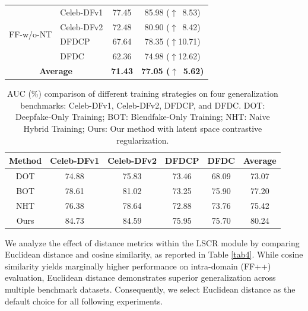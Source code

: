 \documentclass[final,5p,times]{elsarticle}
\begin{document}
\begin{table}[htb]
\begin{tabular}{llcc}
        \multirow{4}{*}{FF-w/o-NT} 
        & Celeb-DFv1  & 77.45 & 85.98 ($\uparrow \,$ 8.53) \\
        & Celeb-DFv2  & 72.48 & 80.90 ($\uparrow \,$ 8.42) \\
        & DFDCP       & 67.64 & 78.35 ($\uparrow$10.71) \\
        & DFDC        & 62.36 & 74.98 ($\uparrow$12.62) \\
        \midrule
        \multicolumn{2}{c}{\textbf{Average}} & \textbf{71.43} & \textbf{77.05 ($\uparrow \,$ 5.62)} \\
        \bottomrule
    \end{tabular}
\end{table}

\begin{table}[htb]\rmfamily
    \centering
    \caption{AUC (\%) comparison of different training strategies on four generalization benchmarks: Celeb-DFv1, Celeb-DFv2, DFDCP, and DFDC. DOT: Deepfake-Only Training; BOT: Blendfake-Only Training; NHT: Naive Hybrid Training; Ours: Our method with latent space contrastive regularization.}
    \label{tab6}
\begin{tabular}{cccccc}\toprule                    													            														

Method& \multicolumn{1}{c}{Celeb-DFv1} & Celeb-DFv2&                         DFDCP& DFDC&                         Average
\\\midrule DOT& \multicolumn{1}{c}{74.88 }                        & \multicolumn{1}{c}{75.83 } & \multicolumn{1}{c}{73.46 } & \multicolumn{1}{c}{68.09 } & \multicolumn{1}{c}{73.07 
}   \\ 
BOT& \multicolumn{1}{c}{78.61 }                        & \multicolumn{1}{c}{81.02 }    & \multicolumn{1}{c}{73.25 }     & \multicolumn{1}{c}{75.90 }    & \multicolumn{1}{c}{77.20 
}              \\ 
 NHT& 76.38 & 78.64 & 72.88 & 73.76 &75.42 
\\
 Ours& 84.73 & 84.59 & 75.95 & 75.70 &80.24 
\\ \bottomrule 
\end{tabular}
\end{table}

We analyze the effect of distance metrics within the LSCR module by comparing Euclidean distance and cosine similarity, as reported in Table \ref{tab4}. While cosine similarity yields marginally higher performance on intra-domain (FF++) evaluation, Euclidean distance demonstrates superior generalization across multiple benchmark datasets. Consequently, we select Euclidean distance as the default choice for all following experiments.
\end{document}
